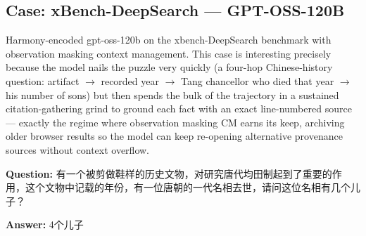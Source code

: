 \subsection{Case: xBench-DeepSearch --- GPT-OSS-120B}

Harmony-encoded gpt-oss-120b on the xbench-DeepSearch benchmark with observation masking context management. This case is interesting precisely because the model nails the puzzle very quickly (a four-hop Chinese-history question: artifact $\to$ recorded year $\to$ Tang chancellor who died that year $\to$ his number of sons) but then spends the bulk of the trajectory in a sustained citation-gathering grind to ground each fact with an exact line-numbered source --- exactly the regime where observation masking CM earns its keep, archiving older browser results so the model can keep re-opening alternative provenance sources without context overflow.

\begin{custombox}[title=xbench-DeepSearch]

\textbf{Question:} 有一个被剪做鞋样的历史文物，对研究唐代均田制起到了重要的作用，这个文物中记载的年份，有一位唐朝的一代名相去世，请问这位名相有几个儿子？

\vspace{1em}

\textbf{Answer:} 4个儿子
\end{custombox}

